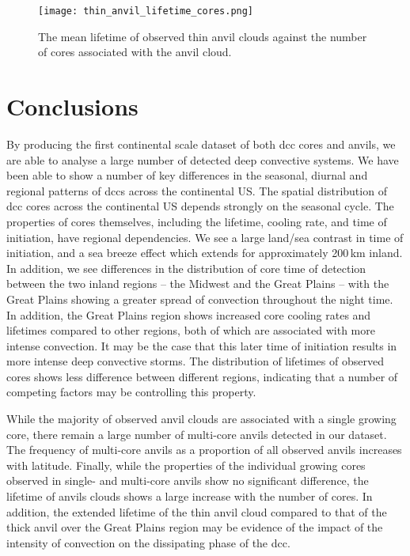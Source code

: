 \begin{figure}[t]
    \centering
    \texttt{[image: thin\_anvil\_lifetime\_cores.png]}
    \caption{The mean lifetime of observed thin anvil clouds against the number of cores associated with the anvil cloud.}
    \label{fig:thin_anvil_lifetime_by_core}
\end{figure}


\section{Conclusions}  %

By producing the first continental scale dataset of both \acrshort{dcc} cores and anvils, we are able to analyse a large number of detected deep convective systems.
We have been able to show a number of key differences in the seasonal, diurnal and regional patterns of \acrshort{dcc}s across the continental US.
The spatial distribution of \acrshort{dcc} cores across the continental US depends strongly on the seasonal cycle.
The properties of cores themselves, including the lifetime, cooling rate, and time of initiation, have regional dependencies.
We see a large land/sea contrast in time of initiation, and a sea breeze effect which extends for approximately 200\,\unit{km} inland.
In addition, we see differences in the distribution of core time of detection between the two inland regions -- the Midwest and the Great Plains -- with the Great Plains showing a greater spread of convection throughout the night time.
In addition, the Great Plains region shows increased core cooling rates and lifetimes compared to other regions, both of which are associated with more intense convection.
It may be the case that this later time of initiation results in more intense deep convective storms.
The distribution of lifetimes of observed cores shows less difference between different regions, indicating that a number of competing factors may be controlling this property.

While the majority of observed anvil clouds are associated with a single growing core, there remain a large number of multi-core anvils detected in our dataset.
The frequency of multi-core anvils as a proportion of all observed anvils increases with latitude.
Finally, while the properties of the individual growing cores observed in single- and multi-core anvils show no significant difference, the lifetime of anvils clouds shows a large increase with the number of cores.
In addition, the extended lifetime of the thin anvil cloud compared to that of the thick anvil over the Great Plains region may be evidence of the impact of the intensity of convection on the dissipating phase of the \acrshort{dcc}.

